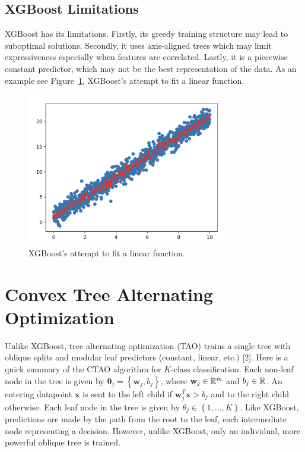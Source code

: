 \documentclass{article}
\begin{document}
\subsection{XGBoost Limitations}

XGBoost has its limitations. Firstly, its greedy training structure may lead to suboptimal solutions.
Secondly, it uses axis-aligned trees which may limit expressiveness especially when features are correlated.
Lastly, it is a piecewise constant predictor, which may not be the best representation of the data. As an example
see Figure~\ref{piecewise-constant}, XGBoost's attempt to fit a linear function.

\begin{figure}
  \centering
  \includegraphics[width=0.8\textwidth]{piecewise_constant.png}
  \caption{XGBoost's attempt to fit a linear function.}
  \label{piecewise-constant}
\end{figure}

\section{Convex Tree Alternating Optimization}
Unlike XGBoost, tree alternating optimization (TAO) trains a single tree with oblique splits and modular leaf predictors (constant, linear, etc.) [2].
Here is a quick summary of the CTAO algorithm for $K$-class classification. Each non-leaf node in the tree is given by $\boldsymbol{\theta}_j = \left\{ \mathbf{w}_j, b_j \right\}$, where $\mathbf{w}_j \in \mathbb{R}^m$ and $b_j \in \mathbb{R}$.
An entering datapoint $\mathbf{x}$ is sent to the left child if $\mathbf{w}_j^T\mathbf{x} > b_j$ and to the right child otherwise. Each leaf node in the tree is given by $\theta_j \in \left\{ 1, \dots, K \right\}$.
Like XGBoost, predictions are made by the path from the root to the leaf, each intermediate node representing a decision. However, unlike XGBoost, only an individual, more powerful oblique tree is trained.
\end{document}
